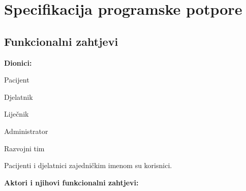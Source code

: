 \chapter{Specifikacija programske potpore}
		
	\section{Funkcionalni zahtjevi}			
			
			\noindent \textbf{Dionici:}
			
			\begin{packed_enum}
				
				\item Pacijent
				\item Djelatnik	
				\begin{packed_item}
					\item Liječnik
					\item Administrator
				\end{packed_item}
				\item Razvojni tim
				
			\end{packed_enum}
			
			Pacijenti i djelatnici zajedničkim imenom su korisnici.
			
			
			\noindent \textbf{Aktori i njihovi funkcionalni zahtjevi:}
			
